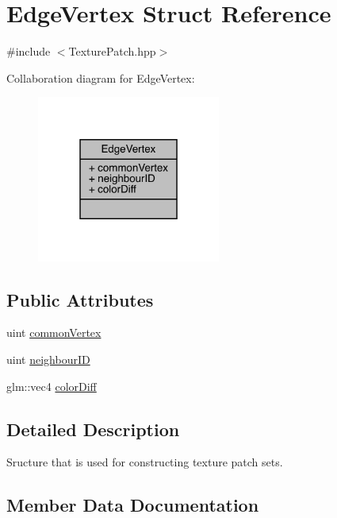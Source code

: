 \hypertarget{struct_edge_vertex}{}\section{Edge\+Vertex Struct Reference}
\label{struct_edge_vertex}


{\ttfamily \#include $<$Texture\+Patch.\+hpp$>$}



Collaboration diagram for Edge\+Vertex\+:\nopagebreak
\begin{figure}[H]
\begin{center}
\leavevmode
\includegraphics[width=171pt]{struct_edge_vertex__coll__graph}
\end{center}
\end{figure}
\subsection*{Public Attributes}
\begin{DoxyCompactItemize}
\item 
uint \hyperlink{struct_edge_vertex_a8439c6928189921562f355db598fcf01}{common\+Vertex}
\item 
uint \hyperlink{struct_edge_vertex_a0383800c9299c747dc5ddbf4b397806d}{neighbour\+I\+D}
\item 
glm\+::vec4 \hyperlink{struct_edge_vertex_a7c1790b8527e54c9eca13038c5351032}{color\+Diff}
\end{DoxyCompactItemize}


\subsection{Detailed Description}
Sructure that is used for constructing texture patch sets. 

\subsection{Member Data Documentation}
\hypertarget{struct_edge_vertex_a7c1790b8527e54c9eca13038c5351032}{}
